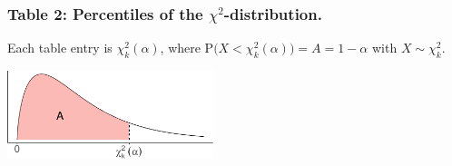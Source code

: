 \documentclass[]{article}
\begin{document}
\hypertarget{table-2-percentiles-of-the-chi2-distribution.}{%
\subsubsection{\texorpdfstring{Table 2: Percentiles of the \(\chi^2\)-distribution.}{Table 2: Percentiles of the \textbackslash{}chi\^{}2 distribution.}}\label{table-2-percentiles-of-the-chi2-distribution.}}

Each table entry is \(\chi^2_k(\alpha)\), where
\(\text{P}\big(X < \chi^2_k(\alpha)\big)=A=1-\alpha\) with
\(X\sim\chi^2_k\). \vspace{0.5em}

\begin{center}\includegraphics[width=6cm]{stat-tables_files/figure-latex/unnamed-chunk-3-1} \end{center}

\vspace{-0.5em}
\end{document}
